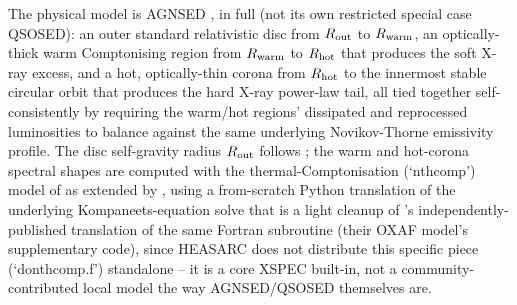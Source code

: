 \documentclass{aastex7}
\begin{document}
The physical model is AGNSED \citep{KubotaDone2018}, in full (not its own
restricted special case QSOSED): an outer standard \citet{NovikovThorne1973}
relativistic disc from $R_{\rm out}$ to $R_{\rm warm}$, an optically-thick
warm Comptonising region from $R_{\rm warm}$ to $R_{\rm hot}$ that produces
the soft X-ray excess, and a hot, optically-thin corona from $R_{\rm hot}$
to the innermost stable circular orbit that produces the hard X-ray
power-law tail, all tied together self-consistently by requiring the
warm/hot regions' dissipated and reprocessed luminosities to balance against
the same underlying Novikov-Thorne emissivity profile. The disc self-gravity
radius $R_{\rm out}$ follows \citet{LaorNetzer1989}; the warm and hot-corona
spectral shapes are computed with the thermal-Comptonisation (`nthcomp')
model of \citet{ZdziarskiJohnsonMagdziarz1996} as extended by
\citet{ZyckiDoneSmith1999}, using a from-scratch Python translation of the
underlying Kompaneets-equation solve that is a light cleanup of
\citet{Thomas2016}'s independently-published translation of the same
Fortran subroutine (their OXAF model's supplementary code), since HEASARC
does not distribute this specific piece (`donthcomp.f') standalone -- it is
a core XSPEC built-in, not a community-contributed local model the way
AGNSED/QSOSED themselves are.
\end{document}
